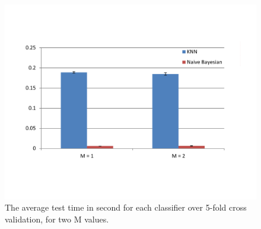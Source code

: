 \documentclass{article}
\begin{document}
\begin{figure}
\includegraphics[width=1.0\textwidth]{TestTime}
\caption{The average test time in second for each classifier over 5-fold cross validation, for two M values.}
\label{Fig:perf}
\end{figure}
\end{document}
